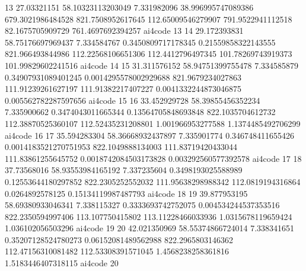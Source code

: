 {13 27.03321151 58.10323113203049 7.331982096 38.996995747089386 679.3021986484528 821.7508952617645 112.65009546279907 791.9522941112518 82.1675705909729 761.4697692394257 ai4code 13
14 29.172393831 58.75176697969437 7.334584767 0.3450809717178345 0.21559858322143555 821.966493844986 112.22568106651306 112.4412796497345 101.78269743919373 101.99829602241516 ai4code 14
15 31.311576152 58.94751399755478 7.334585879 0.34907931089401245 0.0014295578002929688 821.9679234027863 111.91239261627197 111.91382217407227 0.0041332244873046875 0.005562782287597656 ai4code 15
16 33.452929728 58.39855456352234 7.335900662 0.3474043011665344 0.13564705848693848 822.1035704612732 112.38870525360107 112.52435231208801 1.001966953277588 1.1374485492706299 ai4code 16
17 35.594283304 58.36668932437897 7.335901774 0.346748411655426 0.0014183521270751953 822.1049888134003 111.83719420433044 111.83861255645752 0.0018742084503173828 0.003292560577392578 ai4code 17
18 37.73568016 58.93553984165192 7.337235604 0.3498193025588989 0.12553644180297852 822.2305252552032 111.95638298988342 112.0819194316864 0.0264892578125 0.15134119987487793 ai4code 18
19 39.877953195 58.69380933046341 7.338115327 0.3333693742752075 0.004534244537353516 822.2350594997406 113.107750415802 113.11228466033936 1.0315678119659424 1.036102056503296 ai4code 19
20 42.021350969 58.55374866724014 7.338341651 0.35207128524780273 0.06152081489562988 822.2965803146362 112.47156310081482 112.53308391571045 1.4568238258361816 1.5183446407318115 ai4code 20
}\tableexpipercellaicode
